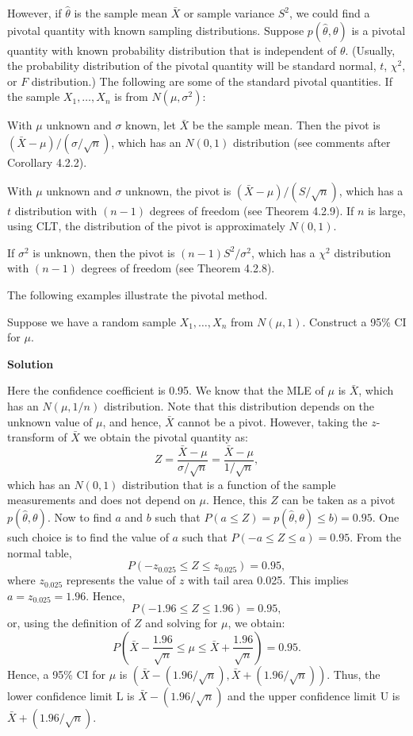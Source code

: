 However, if $\hat{\theta}$ is the sample mean $\bar{X}$ or sample variance $S^2$, we could find a pivotal quantity with known sampling distributions. Suppose $p(\hat{\theta}, \theta)$ is a pivotal quantity with known probability distribution that is independent of $\theta$. (Usually, the probability distribution of the pivotal quantity will be standard normal, $t$, $\chi^2$, or $F$ distribution.) The following are some of the standard pivotal quantities. If the sample $X_1, \ldots, X_n$ is from $N(\mu, \sigma^2)$:

With $\mu$ unknown and $\sigma$ known, let $\bar{X}$ be the sample mean. Then the pivot is $(\bar{X} - \mu)/(\sigma/\sqrt{n})$, which has an $N(0, 1)$ distribution (see comments after Corollary 4.2.2).

With $\mu$ unknown and $\sigma$ unknown, the pivot is $(\bar{X} - \mu)/(S/\sqrt{n})$, which has a $t$ distribution with $(n-1)$ degrees of freedom (see Theorem 4.2.9). If $n$ is large, using CLT, the distribution of the pivot is approximately $N(0, 1)$.

If $\sigma^2$ is unknown, then the pivot is $(n-1)S^2/\sigma^2$, which has a $\chi^2$ distribution with $(n-1)$ degrees of freedom (see Theorem 4.2.8).

The following examples illustrate the pivotal method.

\begin{example}[5.4.2]
Suppose we have a random sample $X_1, \ldots, X_n$ from $N(\mu, 1)$. Construct a 95\% CI for $\mu$.

\textbf{Solution}

Here the confidence coefficient is 0.95. We know that the MLE of $\mu$ is $\bar{X}$, which has an $N(\mu, 1/n)$ distribution. Note that this distribution depends on the unknown value of $\mu$, and hence, $\bar{X}$ cannot be a pivot. However, taking the $z$-transform of $\bar{X}$ we obtain the pivotal quantity as:
\[
Z = \frac{\bar{X} - \mu}{\sigma/\sqrt{n}} = \frac{\bar{X} - \mu}{1/\sqrt{n}},
\]
which has an $N(0, 1)$ distribution that is a function of the sample measurements and does not depend on $\mu$. Hence, this $Z$ can be taken as a pivot $p(\hat{\theta}, \theta)$. Now to find $a$ and $b$ such that $P(a \leq Z) = p(\hat{\theta}, \theta) \leq b) = 0.95$. One such choice is to find the value of $a$ such that $P(-a \leq Z \leq a) = 0.95$. From the normal table,
\[
P(-z_{0.025} \leq Z \leq z_{0.025}) = 0.95,
\]
where $z_{0.025}$ represents the value of $z$ with tail area 0.025. This implies $a = z_{0.025} = 1.96$. Hence,
\[
P(-1.96 \leq Z \leq 1.96) = 0.95,
\]
or, using the definition of $Z$ and solving for $\mu$, we obtain:
\[
P\left(\bar{X} - \frac{1.96}{\sqrt{n}} \leq \mu \leq \bar{X} + \frac{1.96}{\sqrt{n}}\right) = 0.95.
\]
Hence, a 95\% CI for $\mu$ is $(\bar{X} - (1.96/\sqrt{n}), \bar{X} + (1.96/\sqrt{n}))$. Thus, the lower confidence limit L is $\bar{X} - (1.96/\sqrt{n})$ and the upper confidence limit U is $\bar{X} + (1.96/\sqrt{n})$.
\end{example}

